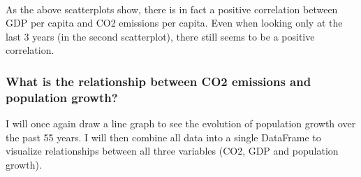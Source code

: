\documentclass[11pt]{article}
\begin{document}
    \begin{center}
    \end{center}
    { \hspace*{\fill} \\}
    
    As the above scatterplots show, there is in fact a positive correlation
between GDP per capita and CO2 emissions per capita. Even when looking
only at the last 3 years (in the second scatterplot), there still seems
to be a positive correlation.

    \hypertarget{what-is-the-relationship-between-co2-emissions-and-population-growth}{%
\subsubsection{What is the relationship between CO2 emissions and
population
growth?}\label{what-is-the-relationship-between-co2-emissions-and-population-growth}}

    I will once again draw a line graph to see the evolution of population
growth over the past 55 years. I will then combine all data into a
single DataFrame to visualize relationships between all three variables
(CO2, GDP and population growth).
\end{document}

